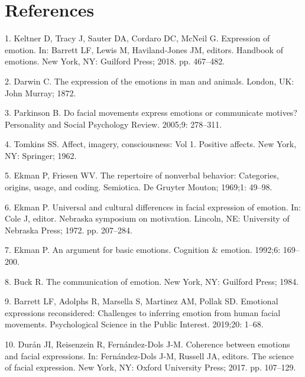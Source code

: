 \documentclass[10pt,letterpaper]{article}
\begin{document}
\hypertarget{references}{%
\section*{References}\label{references}}

\hypertarget{refs}{}
\leavevmode\hypertarget{ref-keltner2016expression}{}%
1. Keltner D, Tracy J, Sauter DA, Cordaro DC, McNeil G. Expression of emotion. In: Barrett LF, Lewis M, Haviland-Jones JM, editors. Handbook of emotions. New York, NY: Guilford Press; 2018. pp. 467--482.

\leavevmode\hypertarget{ref-darwin1872expression}{}%
2. Darwin C. The expression of the emotions in man and animals. London, UK: John Murray; 1872.

\leavevmode\hypertarget{ref-parkinson2005facial}{}%
3. Parkinson B. Do facial movements express emotions or communicate motives? Personality and Social Psychology Review. 2005;9: 278--311.

\leavevmode\hypertarget{ref-tomkins1962affect}{}%
4. Tomkins SS. Affect, imagery, consciousness: Vol 1. Positive affects. New York, NY: Springer; 1962.

\leavevmode\hypertarget{ref-ekman1969repertoire}{}%
5. Ekman P, Friesen WV. The repertoire of nonverbal behavior: Categories, origins, usage, and coding. Semiotica. De Gruyter Mouton; 1969;1: 49--98.

\leavevmode\hypertarget{ref-ekman1972universal}{}%
6. Ekman P. Universal and cultural differences in facial expression of emotion. In: Cole J, editor. Nebraska symposium on motivation. Lincoln, NE: University of Nebraska Press; 1972. pp. 207--284.

\leavevmode\hypertarget{ref-ekman1992argument}{}%
7. Ekman P. An argument for basic emotions. Cognition \& emotion. 1992;6: 169--200.

\leavevmode\hypertarget{ref-buck1984communication}{}%
8. Buck R. The communication of emotion. New York, NY: Guilford Press; 1984.

\leavevmode\hypertarget{ref-barrett2019emotional}{}%
9. Barrett LF, Adolphs R, Marsella S, Martinez AM, Pollak SD. Emotional expressions reconsidered: Challenges to inferring emotion from human facial movements. Psychological Science in the Public Interest. 2019;20: 1--68.

\leavevmode\hypertarget{ref-duran2017coherence}{}%
10. Durán JI, Reisenzein R, Fernández-Dols J-M. Coherence between emotions and facial expressions. In: Fernández-Dols J-M, Russell JA, editors. The science of facial expression. New York, NY: Oxford University Press; 2017. pp. 107--129.
\end{document}
